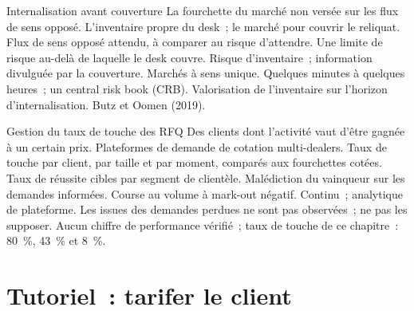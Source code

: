 \begin{strategyfile}{Internalisation avant couverture}\label{strat:s2:flow-market-making-at-a-bank:internalise}
 La fourchette du marché non versée sur les flux de sens opposé.
 L'inventaire propre du desk~; le marché pour couvrir le reliquat.
 Flux de sens opposé attendu, à comparer au risque d'attendre.
 Une limite de risque au-delà de laquelle le desk couvre.
 Risque d'inventaire~; information divulguée par la couverture.
 Marchés à sens unique.
 Quelques minutes à quelques heures~; un central risk book (CRB).
 Valorisation de l'inventaire sur l'horizon d'internalisation.
 Butz et Oomen (2019).
\end{strategyfile}

\begin{strategyfile}{Gestion du taux de touche des RFQ}\label{strat:s2:flow-market-making-at-a-bank:winrate}
 Des clients dont l'activité vaut d'être gagnée à un certain prix.
 Plateformes de demande de cotation multi-dealers.
 Taux de touche par client, par taille et par moment, comparés aux fourchettes cotées.
 Taux de réussite cibles par segment de clientèle.
 Malédiction du vainqueur sur les demandes informées.
 Course au volume à mark-out négatif.
 Continu~; analytique de plateforme.
 Les issues des demandes perdues ne sont pas observées~; ne pas les supposer.
 Aucun chiffre de performance vérifié~; taux de touche de ce chapitre~: 80~\%, 43~\% et 8~\%.
\end{strategyfile}

\section{Tutoriel~: tarifer le client}\label{tut:s2:flow-market-making-at-a-bank:tut}

